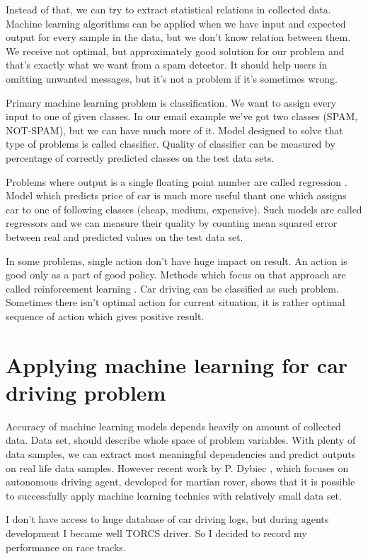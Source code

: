 \documentclass[declaration,shortabstract,english,inz]{iithesis}
\begin{document}
 Instead of that, we can try to extract statistical relations in collected data.
Machine learning algorithms can be applied when we have input and expected output for every sample in the data, but we don't know relation between them.
We receive not optimal, but approximately good solution for our problem and that's exactly what we want from a spam detector.
It should help users in omitting unwanted messages, but it's not a problem if it's sometimes wrong.

 Primary machine learning problem is classification\cite{Introduction_ML}.
We want to assign every input to one of given classes.
In our email example we've got two classes (SPAM, NOT-SPAM), but we can have much more of it.
Model designed to solve that type of problems is called classifier.
Quality of classifier can be measured by percentage of correctly predicted classes on the test data sets.

 Problems where output is a single floating point number are called regression \cite{Introduction_ML}.
Model which predicts price of car is much more useful thant one which assigns car to one of following classes  (cheap, medium, expensive).
Such models are called regressors and we can measure their quality by counting mean squared error between real and predicted values on the test data set.

In some problems, single action don't have huge impact on result.
An action is good only as a part of good policy.
Methods which focus on that approach are called reinforcement learning \cite{Introduction_ML}.
Car driving can be classified as such problem.
Sometimes there isn't optimal action for current situation, it is rather optimal sequence of action which gives positive result.


\section{Applying machine learning for car driving problem}

Accuracy of machine learning models depends heavily on amount of collected data.
Data set, should describe whole space of problem variables.
With plenty of data samples, we can extract most meaningful dependencies and predict outputs on real life data samples.
However recent work by P. Dybiec \cite[2018]{rover}, which focuses on autonomous driving agent, developed for martian rover, shows that it is possible to successfully apply machine learning technics with relatively small data set.

  
I don't have access to huge database of car driving logs, but during agents development I became well TORCS driver.
So I decided to record my performance on race tracks.
\end{document}
